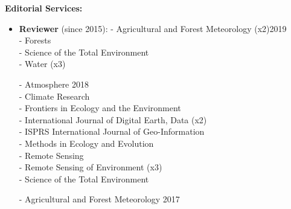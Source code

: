 \documentclass[10pt]{article}
\newenvironment{changemargin}[2]{%
  \begin{list}{}{%
 \setlength{\topsep}{0pt}%
 \setlength{\leftmargin}{#1}%
 \setlength{\rightmargin}{#2}%
 \setlength{\listparindent}{\parindent}%
 \setlength{\itemindent}{\parindent}%
 \setlength{\parsep}{\parskip}%
  }%
  \item[]}{\end{list}
}
\newenvironment{body} {
  \vspace*{-2pt}
  \begin{changemargin}{-0.5in}{-0.5in}
}
{\end{changemargin}
}
\begin{document}
\begin{body}

  \textbf{Editorial Services:} \\
  \vspace*{-4pt}
  \begin{itemize} \itemsep -0pt
    \item[] \textbf {Reviewer} (since 2015):
          \newline
          \hspace*{8pt}  - Agricultural and Forest Meteorology (x2)\hfill {2019} \\
          \hspace*{8pt}  - Forests \\
          \hspace*{8pt}  - Science of the Total Environment \\
          \hspace*{8pt}  - Water (x3) \\
          \bigskip

          \hspace*{8pt}  - Atmosphere \hfill {2018} \\
          \hspace*{8pt}  - Climate Research\\
          \hspace*{8pt}  - Frontiers in Ecology and the Environment \\
          \hspace*{8pt}  - International Journal of Digital Earth, Data (x2) \\
          \hspace*{8pt}  - ISPRS International Journal of Geo-Information\\
          \hspace*{8pt}  - Methods in Ecology and Evolution\\
          \hspace*{8pt}  - Remote Sensing\\
          \hspace*{8pt}  - Remote Sensing of Environment (x3)\\
          \hspace*{8pt}  - Science of the Total Environment\\
          \bigskip

          \hspace*{8pt}  - Agricultural and Forest Meteorology  \hfill {2017} \\
          \bigskip


\end{itemize}
\end{body}
\end{document}
